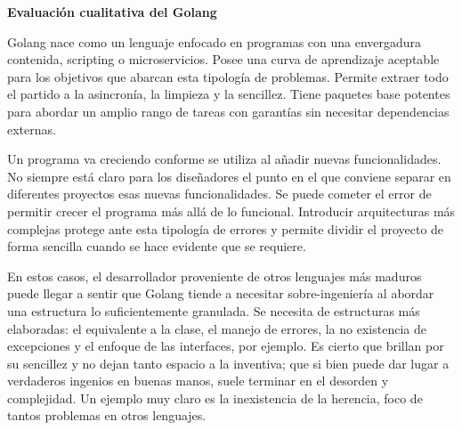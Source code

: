 \textbf{Evaluación cualitativa del Golang}

Golang nace como un lenguaje enfocado en programas con una envergadura contenida, scripting o microservicios.
Posee una curva de aprendizaje aceptable para los objetivos que abarcan esta tipología de problemas.
Permite extraer todo el partido a la asincronía, la limpieza y la sencillez.
Tiene paquetes base potentes para abordar un amplio rango de tareas con garantías sin necesitar dependencias externas.

Un programa va creciendo conforme se utiliza al añadir nuevas funcionalidades.
No siempre está claro para los diseñadores el punto en el que conviene separar en diferentes proyectos esas nuevas funcionalidades.
Se puede cometer el error de permitir crecer el programa más allá de lo funcional.
Introducir arquitecturas más complejas protege ante esta tipología de errores y permite dividir el proyecto de forma sencilla cuando se hace evidente que se requiere.

En estos casos, el desarrollador proveniente de otros lenguajes más maduros puede llegar a sentir que Golang tiende a necesitar sobre-ingeniería al abordar una estructura lo suficientemente granulada.
Se necesita de estructuras más elaboradas: el equivalente a la clase, el manejo de errores, la no existencia de excepciones y el enfoque de las interfaces, por ejemplo.
Es cierto que brillan por su sencillez y no dejan tanto espacio a la inventiva;
que si bien puede dar lugar a verdaderos ingenios en buenas manos, suele terminar en el desorden y complejidad.
Un ejemplo muy claro es la inexistencia de la herencia, foco de tantos problemas en otros lenguajes.

